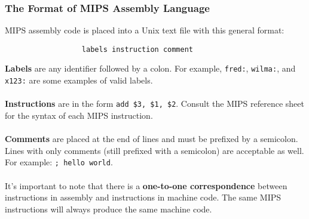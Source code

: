 \documentclass[]{article}
\theoremstyle{definition}
\begin{document}
		\subsubsection{The Format of MIPS Assembly Language}
			MIPS assembly code is placed into a Unix text file with this general format:
			\begin{verbatim}
			      labels instruction comment
			\end{verbatim}
			
			\textbf{Labels} are any identifier followed by a colon. For example, \verb+fred:+, \verb+wilma:+, and \verb+x123:+ are some examples of valid labels.
			\\ \\
			\textbf{Instructions} are in the form \verb+add $3, $1, $2+. Consult the MIPS reference sheet for the syntax of each MIPS instruction.
			\\ \\
			\textbf{Comments} are placed at the end of lines and must be prefixed by a semicolon. Lines with only comments (still prefixed with a semicolon) are acceptable as well. For example: \verb+; hello world+.
			\\ \\
			It's important to note that there is a \textbf{one-to-one correspondence} between instructions in assembly and instructions in machine code. The same MIPS instructions will always produce the same machine code.
\end{document}

